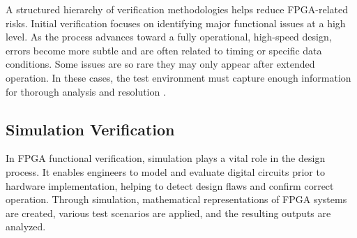 A structured hierarchy of verification methodologies helps reduce \acs{FPGA}-related risks. Initial verification focuses on identifying major functional issues at a high level. As the process advances toward a fully operational, high-speed design, errors become more subtle and are often related to timing or specific data conditions. Some issues are so rare they may only appear after extended operation. In these cases, the test environment must capture enough information for thorough analysis and resolution \cite{Bouldin2006_FPGA}.


\subsection{Simulation Verification}
\label{sec:TechBackground:Simulation_Verification} 

In \acs{FPGA} functional verification, simulation plays a vital role in the design process. It enables engineers to model and evaluate digital circuits prior to hardware implementation, helping to detect design flaws and confirm correct operation. Through simulation, mathematical representations of \acs{FPGA} systems are created, various test scenarios are applied, and the 
resulting outputs are analyzed. 

